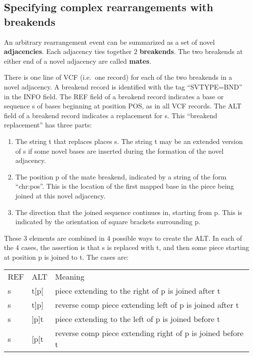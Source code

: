 \documentclass[8pt]{article}
\begin{document}
\subsection{Specifying complex rearrangements with breakends}

An arbitrary rearrangement event can be summarized as a set of novel \textbf{adjacencies}. Each adjacency ties together $2$ \textbf{breakends}.
The two breakends at either end of a novel adjacency are called \textbf{mates}.

There is one line of VCF (i.e.\ one record) for each of the two breakends in a novel adjacency.
A breakend record is identified with the tag ``SVTYPE=BND'' in the INFO field.
The REF field of a breakend record indicates a base or sequence s of bases beginning at position POS, as in all VCF records.
The ALT field of a breakend record indicates a replacement for s.
This ``breakend replacement'' has three parts:
\begin{enumerate}
  \item The string t that replaces places s.
  The string t may be an extended version of s if some novel bases are inserted during the formation of the novel adjacency.
  \item The position p of the mate breakend, indicated by a string of the form ``chr:pos''.
  This is the location of the first mapped base in the piece being joined at this novel adjacency.
  \item The direction that the joined sequence continues in, starting from p.
  This is indicated by the orientation of square brackets surrounding p.

\end{enumerate}
These 3 elements are combined in 4 possible ways to create the ALT.
In each of the 4 cases, the assertion is that s is replaced with t, and then some piece starting at position p is joined to t.
The cases are:

\vspace{0.3cm}
\begin{tabular}{ l l l }
REF & ALT & Meaning \\
s & t$[$p$[$ & piece extending to the right of p is joined after t \\
s & t$]$p$]$ & reverse comp piece extending left of p is joined after t \\
s & $]$p$]$t & piece extending to the left of p is joined before t \\
s & $[$p$[$t & reverse comp piece extending right of p is joined before t \\
\end{tabular}
\vspace{0.3cm}
\end{document}
